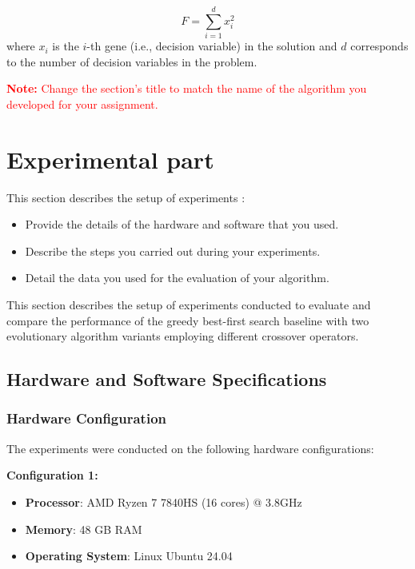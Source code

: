 \documentclass{scrartcl}
\begin{document}
\begin{equation}
    F = \sum_{i=1}^d x_i^2 
\end{equation}
where $x_i$ is the $i$-th gene (i.e., decision variable) in the solution and $d$ corresponds to the number of decision variables in the problem.

\textcolor{red}{\textbf{Note:} Change the section's title to match the name of the algorithm you developed for your assignment.}

\lipsum[3]


\section{Experimental part}
\label{sec:experimentation}

{\color{red}
This section describes the setup of experiments \cite{zobel2014experimentation}:

\begin{itemize}
    \item Provide the details of the hardware and software that you used.
    \item Describe the steps you carried out during your experiments.
    \item Detail the data you used for the evaluation of your algorithm.
\end{itemize}
}

This section describes the setup of experiments conducted to evaluate and compare the performance of the greedy best-first search baseline with two evolutionary algorithm variants employing different crossover operators.

\subsection{Hardware and Software Specifications}

\subsubsection{Hardware Configuration}
The experiments were conducted on the following hardware configurations:

\textbf{Configuration 1:}
\begin{itemize}
    \item \textbf{Processor}: AMD Ryzen 7 7840HS (16 cores) @ 3.8GHz
    \item \textbf{Memory}: 48 GB RAM
    \item \textbf{Operating System}: Linux Ubuntu 24.04
\end{itemize}
\end{document}
